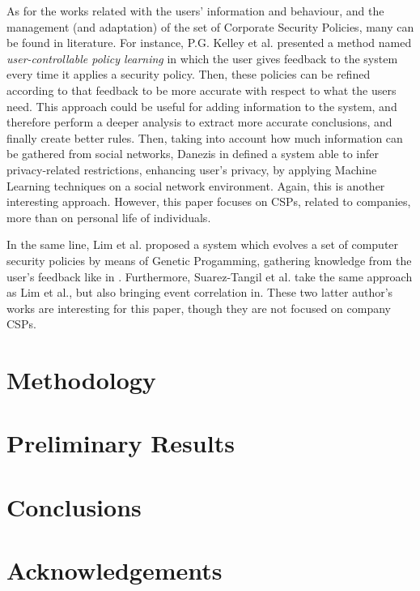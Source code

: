 \documentclass{sig-alternate}
\begin{document}
As for the works related with the users' information and behaviour, and the management (and adaptation) of the set of Corporate Security Policies, many can be found in literature. For instance, P.G. Kelley et al. \cite{user-controllable_learning_08} presented a method named \textit{user-controllable policy learning} in which the user gives feedback to the system every time it applies a security policy. Then, these policies can be refined according to that feedback to be more accurate with respect to what the users need. This approach could be useful for adding information to the system, and therefore perform a deeper analysis to extract more accurate conclusions, and finally create better rules.
Then, taking into account how much information can be gathered from social networks, Danezis in \cite{inferring_policies_socialnetworks_09} defined a system able to infer privacy-related restrictions, enhancing user's privacy, by applying Machine Learning techniques on a social network environment. Again, this is another interesting approach. However, this paper focuses on CSPs, related to companies, more than on personal life of individuals.

In the same line, Lim et al. proposed a system \cite{lim2008mls, lim2008policy} which evolves a set of computer security policies by means of Genetic Progamming, gathering knowledge from the user's feedback like in \cite{user-controllable_learning_08}. Furthermore, Suarez-Tangil et al. \cite{suarez2009automatic} take the same approach as Lim et al., but also bringing event correlation in. These two latter author's works are interesting for this paper, though they are not focused on company CSPs.

%
%
\section{Methodology}
\label{sec:methodology}

%
%
\section{Preliminary Results}
\label{sec:results}

%
%
\section{Conclusions}
\label{sec:conclusions}

%
%
\section{Acknowledgements}



\end{document}
